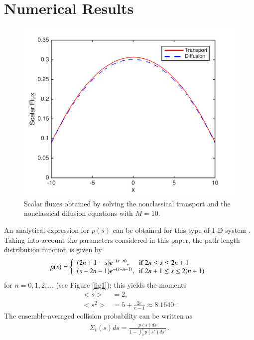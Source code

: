 \documentclass{anstrans}
\newcommand{\bl}{\big<}
\newcommand{\bg}{\big>}
\begin{document}
\section{Numerical Results}
\begin{figure}[t] %
  \centering
  \includegraphics[scale=0.7]{Fig2_temp}
  \caption{Scalar fluxes obtained by solving the nonclassical transport and the nonclassical difusion equations with $M=10$.}
  \label{fig2}
\end{figure}
An analytical expression for $p(s)$ can be obtained for this type of 1-D system \cite{vas15}. Taking into account the parameters considered in this paper, the path length distribution function is given by 
\begin{align}
p(s) = \left\{
\begin{array}{ll}
(2n+1-s)e^{-(s-n)}, & \text{\hspace{-3pt}if $2n\leq s \leq 2n+1$}\\
(s-2n-1)e^{-(s-n-1)}, & \text{\hspace{-3pt}if $2n+1\leq s \leq 2(n+1)$}
\end{array}
\right.\nonumber
\end{align}
for $n=0,1,2,...$ (see Figure \ref{fig1}); this yields the moments
\begin{align}
\bl s\bg &= 2,\nonumber\\
\bl s^2\bg &= 5+\frac{2e}{e-1} \approx 8.1640 \, .\nonumber
\end{align}
The ensemble-averaged collision probability can be written as \cite{vas14a}
\begin{align}
\Sigma_t(s)ds = \frac{p(s)ds}{1-\int_0^sp(s')ds'}\,.\nonumber
\end{align} 
\end{document}
